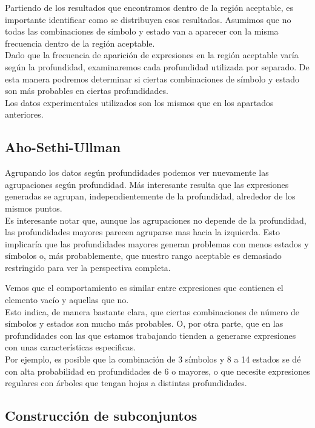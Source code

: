 Partiendo de los resultados que encontramos dentro de la región aceptable, es importante identificar como se distribuyen esos resultados.
Asumimos que no todas las combinaciones de símbolo y estado van a aparecer con la misma frecuencia dentro de la región aceptable.
\\
Dado que la frecuencia de aparición de expresiones en la región aceptable varía según la profundidad, examinaremos cada profundidad utilizada por separado.
De esta manera podremos determinar si ciertas combinaciones de símbolo y estado son más probables en ciertas profundidades.
\\
Los datos experimentales utilizados son los mismos que en los apartados anteriores.

\subsection{Aho-Sethi-Ullman}

Agrupando los datos según profundidades podemos ver nuevamente las agrupaciones según profundidad.
Más interesante resulta que las expresiones generadas se agrupan, independientemente de la profundidad, alrededor de los mismos puntos.
\\
Es interesante notar que, aunque las agrupaciones no depende de la profundidad, las profundidades mayores parecen agruparse mas hacia la izquierda.
Esto implicaría que las profundidades mayores generan problemas con menos estados y símbolos o, más probablemente, que nuestro rango aceptable es demasiado restringido para ver la perspectiva completa.


Vemos que el comportamiento es similar entre expresiones que contienen el elemento vacío y aquellas que no.
\\
Esto indica, de manera bastante clara, que ciertas combinaciones de número de símbolos y estados son mucho más probables.
O, por otra parte, que en las profundidades con las que estamos trabajando tienden a generarse expresiones con unas características especificas.
\\
Por ejemplo, es posible que la combinación de 3 símbolos y 8 a 14 estados se dé con alta probabilidad en profundidades de 6 o mayores, o que necesite expresiones regulares con árboles que tengan hojas a distintas profundidades.

\subsection{Construcción de subconjuntos}

